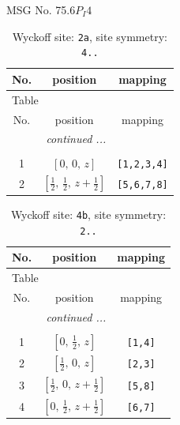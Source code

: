 \documentclass[fleqn,8pt]{jsarticle}
\begin{document}
\setcounter{MaxMatrixCols}{32}

\renewcommand{\tablename}{Table~}
\renewcommand{\figurename}{Figure~}
\begin{center}
\LARGE
MSG No. 75.6\quad$P_{I}4$
\end{center}
\renewcommand{\arraystretch}{1.2}
\begin{longtable}{ccc}
\caption{Wyckoff site: {\tt 2a}, site symmetry: {\tt 4..}}
 \\
 \hline \hline
No. & position & mapping \\ \hline \endfirsthead

\multicolumn{2}{l}{\tablename\ \thetable{}} \\
 \hline \hline
No. & position & mapping \\ \hline \endhead

 \hline \hline
\multicolumn{2}{r}{\footnotesize\it continued ...} \\ \endfoot

 \hline \hline
\multicolumn{2}{r}{} \\ \endlastfoot

1 & $\left[ 0,\, 0,\, z \right]$ & {\tt [1,2,3,4]} \\ \hline
2 & $\left[ \frac{1}{2},\, \frac{1}{2},\, z + \frac{1}{2} \right]$ & {\tt [5,6,7,8]} \\
\end{longtable}
\renewcommand{\arraystretch}{1.2}
\begin{longtable}{ccc}
\caption{Wyckoff site: {\tt 4b}, site symmetry: {\tt 2..}}
 \\
 \hline \hline
No. & position & mapping \\ \hline \endfirsthead

\multicolumn{2}{l}{\tablename\ \thetable{}} \\
 \hline \hline
No. & position & mapping \\ \hline \endhead

 \hline \hline
\multicolumn{2}{r}{\footnotesize\it continued ...} \\ \endfoot

 \hline \hline
\multicolumn{2}{r}{} \\ \endlastfoot

1 & $\left[ 0,\, \frac{1}{2},\, z \right]$ & {\tt [1,4]} \\ \hline
2 & $\left[ \frac{1}{2},\, 0,\, z \right]$ & {\tt [2,3]} \\ \hline
3 & $\left[ \frac{1}{2},\, 0,\, z + \frac{1}{2} \right]$ & {\tt [5,8]} \\ \hline
4 & $\left[ 0,\, \frac{1}{2},\, z + \frac{1}{2} \right]$ & {\tt [6,7]} \\
\end{longtable}
\end{document}
